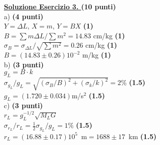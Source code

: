 \documentclass[10pt,a4paper,fleqn]{article}
\begin{document}
\vskip0.30cm {\bf \underline {Soluzione Esercizio 3. } } {\bf (10 punti)}\\
a) {\bf (4 punti)}\\
  $Y=\Delta L$, $X=m$, $Y=BX$ {\bf(1)} \\
  $B=\sum  m \Delta L / \sum m^2 = 14.83$ cm/kg {\bf(1)} \\
  $\sigma_B=\sigma_{\Delta L} / \sqrt{\sum m^2 }= 0.26$ cm/kg {\bf(1)} \\
  $B=(14.83 \pm 0.26) 10^{-2}$ m/kg {\bf(1)} \\
b) {\bf (3 punti)}\\
$g_{L}=B\cdot k$ \\
$\sigma_{g_{L}}/g_{L}=\sqrt{(\sigma_{B}/B)^2+(\sigma_{k}/k)^2}=2\%$  {\bf(1.5)} \\
$g_{L}=(1.720 \pm 0.034) $m/s$^2$ {\bf(1.5)} \\
c) {\bf (3 punti)}\\
$r_L=g_L^{-1/2}  \sqrt{M_L G} $\\
$\sigma_{r_L}/r_L=\frac{1}{2}\sigma_{g_{L}}/g_{L} =1\%$ {\bf(1.5)} \\
$r_L=(16.88\pm 0.17) 10^5$~m$=1688 \pm 17$~km {\bf(1.5)} \\
\end{document}
